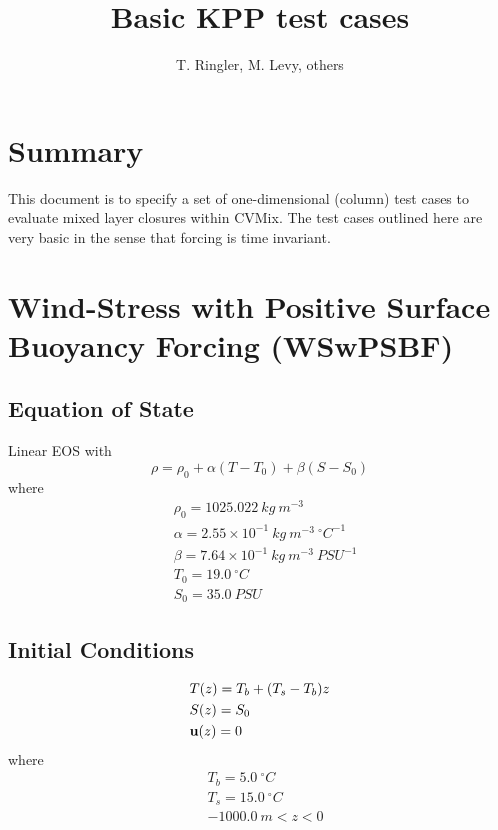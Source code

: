 \documentclass[fleqn, 12pt]{report}
\begin{document}
\title{
Basic KPP test cases}
\author{T. Ringler, M. Levy, others}

\maketitle
\tableofcontents


\chapter{Summary}
This document is to specify a set of one-dimensional (column) test cases to evaluate mixed layer closures within CVMix. The test cases outlined here are very basic in the sense that forcing is time invariant.

\chapter{Wind-Stress with Positive Surface Buoyancy Forcing (WSwPSBF)}

\section{Equation of State}
Linear EOS with
\begin{equation}
\rho = \rho_0 + \alpha (T-T_0) + \beta (S-S_0)
\end{equation}
where 
\begin{align*}
&\rho_0=1025.022 \ kg \ m^{-3} \\
&\alpha=2.55\times10^{-1} \ kg \ m^{-3} \ ^{\circ}C^{-1} \\
&\beta=7.64\times10^{-1} \ kg \ m^{-3} \ {PSU}^{-1} \\
&T_0= 19.0 \ ^{\circ}C \\
&S_0=35.0 \ PSU 
\end{align*}

\section{Initial Conditions}

\begin{align*}
&T(z) = T_b + (T_s - T_b)z  \\
&S(z) = S_0 \\
&{\bf u}(z) = 0
\end{align*}
where
\begin{align*}
&T_b=5.0 \ ^{\circ}C \\
&T_s=15.0 \ ^{\circ}C \\
&-1000.0 \ m <z<0
\end{align*}
\end{document}
